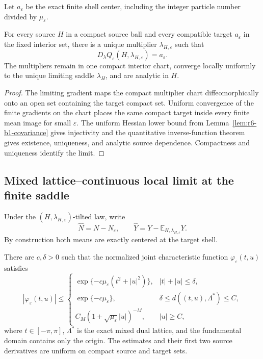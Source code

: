 Let \(a_\varepsilon\) be the exact finite shell center, including the integer
particle number divided by \(\mu_\varepsilon\).

\begin{theorem}
\label{thm:r6-b1-saddle}
For every source \(H\) in a compact source ball and every compatible target
\(a_\varepsilon\) in the fixed interior set, there is a unique multiplier
\(\lambda_{H,\varepsilon}\) such that
\[
D_\lambda Q_\varepsilon(H,\lambda_{H,\varepsilon})=a_\varepsilon.
\]
The multipliers remain in one compact interior chart, converge locally
uniformly to the unique limiting saddle \(\lambda_H\), and are analytic in
\(H\).
\end{theorem}

\begin{proof}
The limiting gradient maps the compact multiplier chart diffeomorphically
onto an open set containing the target compact set.  Uniform convergence of
the finite gradients on the chart places the same compact target inside every
finite mean image for small \(\varepsilon\).  The uniform Hessian lower bound
from Lemma~\ref{lem:r6-b1-covariance} gives injectivity and the quantitative
inverse-function theorem gives existence, uniqueness, and analytic source
dependence.  Compactness and uniqueness identify the limit.
\end{proof}

\subsection{Mixed lattice--continuous local limit at the finite saddle}

Under the \((H,\lambda_{H,\varepsilon})\)-tilted law, write
\[
\widehat N=N-N_\varepsilon,
\qquad
\widehat Y=Y-\mathbb E_{H,\lambda_{H,\varepsilon}}Y.
\]
By construction both means are exactly centered at the target shell.

\begin{theorem}
\label{thm:r6-b1-characteristic}
There are \(c,\delta>0\) such that the normalized joint characteristic
function \(\varphi_\varepsilon(t,u)\) satisfies
\[
|\varphi_\varepsilon(t,u)|
\le
\begin{cases}
\exp\{-c\mu_\varepsilon(t^2+|u|^2)\},
&|t|+|u|\le\delta,\\
\exp\{-c\mu_\varepsilon\},
&\delta\le d((t,u),\Lambda^*)\le C,\\
C_M(1+\sqrt{\mu_\varepsilon}|u|)^{-M},
&|u|\ge C,
\end{cases}
\]
where \(t\in[-\pi,\pi]\), \(\Lambda^*\) is the exact mixed dual lattice,
and the fundamental domain contains only the origin.  The estimates and their
first two source derivatives are uniform on compact source and target sets.
\end{theorem}


